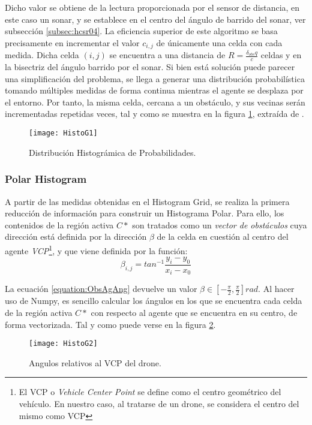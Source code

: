 Dicho valor se obtiene de la lectura proporcionada por el sensor de distancia, en este caso un sonar, y se establece en el centro del ángulo de barrido del sonar, ver subsección \ref{subsec:hcsr04}. 
La eficiencia superior de este algoritmo se basa precisamente en incrementar el valor $c_{i,j}$ de únicamente una celda con cada medida. Dicha celda $(i,j)$ se encuentra a una distancia de $R = \frac{\delta_{obs}q}{c}$ celdas y en la bisectriz del ángulo barrido por el sonar.
Si bien está solución puede parecer una simplificación del problema, se llega a generar una distribución probabilística tomando múltiples medidas de forma continua mientras el agente se desplaza por el entorno. Por tanto, la misma celda, cercana a un obstáculo, y sus vecinas serán incrementadas repetidas veces, tal y como se muestra en la figura \ref{fig:histog1}, extraída de \citep{art:BorensteinKorenVFH}.
 \begin{figure}[H]
	\centering
	\texttt{[image: HistoG1]}
	\caption{Distribución Histográmica de Probabilidades.}\label{fig:histog1}
\end{figure}

\subsubsection{Polar Histogram}
\label{subsubsec:PH}
A partir de las medidas obtenidas en el Histogram Grid, se realiza la primera reducción de información para construir un Histograma Polar. Para ello, los contenidos de la región activa $C*$ son tratados como un \textit{vector de obstáculos} cuya dirección está definida por la dirección $\beta$ de la celda en cuestión al centro del agente \textit{VCP}\footnote{El VCP o \textit{Vehicle Center Point} se define como el centro geométrico del vehículo. En nuestro caso, al tratarse de un drone, se considera el centro del mismo como VCP}, y que viene definida por la función:
\begin{equation}
\label{equation:ObsAgAng}
\beta_{i,j}= tan^{-1} \frac{y_i - y_0}{x_i - x_0}
\end{equation}

La ecuación \ref{equation:ObsAgAng} devuelve un valor $\beta \in [-\frac{\pi}{2}, \frac{\pi}{2}]rad$. Al hacer uso de Numpy, es sencillo calcular los ángulos en los que se encuentra cada celda de la región activa $C*$ con respecto al agente que se encuentra en su centro, de forma vectorizada. Tal y como puede verse en la figura \ref{fig:histog2}.
 \begin{figure}[H]
	\centering
	\texttt{[image: HistoG2]}
	\caption{Angulos relativos al VCP del drone.}\label{fig:histog2}
\end{figure}

